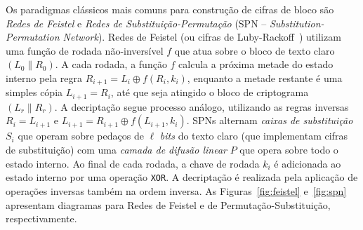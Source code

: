 \documentclass{SBCbookchapter}
\begin{document}
Os paradigmas clássicos mais comuns para construção de cifras de bloco são \emph{Redes de Feistel} e \emph{Redes de Substituição-Permutação} (SPN -- \emph{Substitution-Permutation Network}). Redes de Feistel (ou cifras de Luby-Rackoff~\cite{LubyR88}) utilizam uma função de rodada não-inversível $f$ que atua sobre o bloco de texto claro $(L_0 \parallel R_0)$. A cada rodada, a função $f$ calcula a próxima metade do estado interno pela regra $R_{i+1} = L_i \oplus f(R_i, k_i)$, enquanto a metade restante é uma simples cópia $L_{i+1} = R_i$, até que seja atingido o bloco de criptograma $(L_r \parallel R_r)$. A decriptação segue processo análogo, utilizando as regras inversas $R_{i} = L_{i+1}$ e $L_{i+1} = R_{i+1} \oplus f(L_{i+1}, k_i)$. SPNs alternam \emph{caixas de substituição} $S_i$ que operam sobre pedaços de $\ell$ \emph{bits} do texto claro (que implementam cifras de substituição) com uma \emph{camada de difusão linear} $P$ que opera sobre todo o estado interno. Ao final de cada rodada, a chave de rodada $k_i$ é adicionada ao estado interno por uma operação \texttt{XOR}. A decriptação é realizada pela aplicação de operações inversas também na ordem inversa. As Figuras~\ref{fig:feistel} e~\ref{fig:spn} apresentam diagramas para Redes de Feistel e de Permutação-Substituição, respectivamente.
\end{document}

